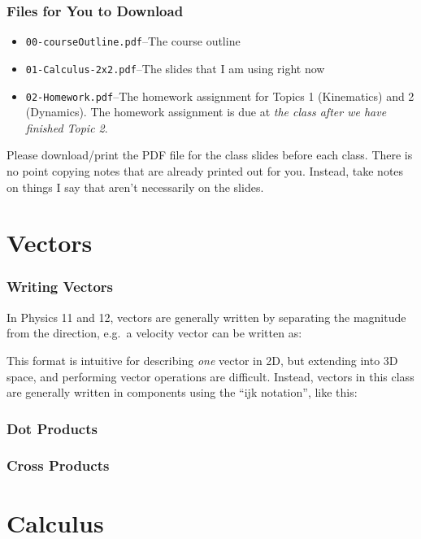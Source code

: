 \documentclass[12pt,compress,aspectratio=169]{beamer}
\newcommand{\mb}[1]{\ensuremath\mathbf{#1}}
\newcommand{\eq}[2]{\vspace{#1}{\Large\begin{displaymath}#2\end{displaymath}}}
\begin{document}
\begin{frame}
  \frametitle{Files for You to Download}
  \begin{itemize}
  \item\texttt{00-courseOutline.pdf}--The course outline
  \item\texttt{01-Calculus-2x2.pdf}--The slides that I am using right now
  \item\texttt{02-Homework.pdf}--The homework assignment for Topics 1
    (Kinematics) and 2 (Dynamics). The homework assignment is due at
    \emph{the class after we have finished Topic 2}.
  \end{itemize}
  Please download/print the PDF file for the class slides before each class.
  There is no point copying notes that are already printed out for you.
  Instead, take notes on things I say that aren't necessarily on the slides.
\end{frame}




\section{Vectors}

\begin{frame}
  \frametitle{Writing Vectors}
  In Physics 11 and 12, vectors are generally written by separating the
  magnitude from the direction, e.g.\ a velocity vector can be written as:
  
  \eq{-.1in}{
    \mb{v}=\SI{4.5}{m/s}\text{ [N \ang{55} E]}
  }

  \vspace{-.1in}This format is intuitive for describing \emph{one} vector in
  2D, but extending into 3D space, and performing vector operations are
  difficult. Instead, vectors in this class are generally written in components
  using the ``ijk notation'', like this:

\end{frame}


\begin{frame}
  \frametitle{Dot Products}
  
\end{frame}



\begin{frame}
  \frametitle{Cross Products}
  
\end{frame}

\section{Calculus}
\end{document}
